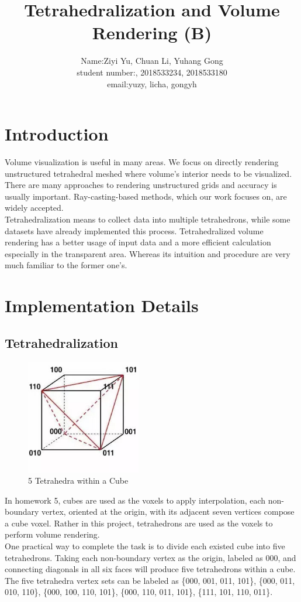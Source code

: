 \documentclass[acmtog]{acmart}
\title{Tetrahedralization and Volume Rendering (B)}
\author{Name:\quad Ziyi Yu, Chuan Li, Yuhang Gong   \\ student number:\quad 2018533124, 2018533234, 2018533180
	\\email:\quad yuzy, licha, gongyh}
\begin{document}
\maketitle

\vspace*{2 ex}

\section{Introduction}
Volume visualization is useful in many areas. We focus on directly rendering unstructured tetrahedral meshed where volume's interior needs to be visualized. There are many approaches to rendering unstructured grids and accuracy is usually important. Ray-casting-based methods, which our work focuses on, are widely accepted.\\
Tetrahedralization means to collect data into multiple tetrahedrons, while some datasets have already implemented this process. Tetrahedralized volume rendering has a better usage of input data and a more efficient calculation especially in the transparent area. Whereas its intuition and procedure are very much familiar to the former one's. 

\section{Implementation Details}
\subsection{Tetrahedralization}
\begin{figure}[h]
\centering
\includegraphics[height=5cm]{figure/cube.jpg}
\caption{5 Tetrahedra within a Cube}
\end{figure}
In homework 5, cubes are used as the voxels to apply interpolation, 
each non-boundary vertex, oriented at the origin, with its adjacent seven vertices compose a cube voxel. Rather in this project, tetrahedrons are used as the voxels to perform volume rendering.
\\One practical way to complete the task is to divide each existed cube into five tetrahedrons.
Taking each non-boundary vertex as the origin, labeled as 000, and connecting diagonals in all six faces will produce five tetrahedrons within a cube. The five tetrahedra vertex sets can be labeled as
\{000, 001, 011, 101\}, \{000, 011, 010, 110\}, \{000, 100, 110, 101\}, \{000, 110, 011, 101\}, \{111, 101, 110, 011\}.
\end{document}
